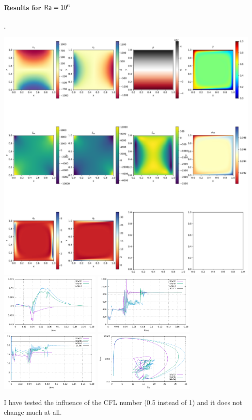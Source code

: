 \paragraph{Results for ${\mathsf{Ra}}=10^6$}.
\begin{center}
\includegraphics[width=16cm]{python_codes/fieldstone_03/results_1e6/48x48/solution.pdf}\\
\includegraphics[width=5cm]{python_codes/fieldstone_03/results_1e6/Tavrg.pdf}
\includegraphics[width=5cm]{python_codes/fieldstone_03/results_1e6/vrms.pdf}\\
\includegraphics[width=5cm]{python_codes/fieldstone_03/results_1e6/Nu.pdf}
\includegraphics[width=5cm]{python_codes/fieldstone_03/results_1e6/Nu_vrms.pdf}
\end{center}


I have tested the influence of the CFL number (0.5 instead of 1) and it does not change much at all.





